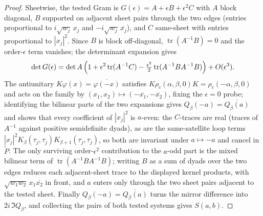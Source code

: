 \documentclass[11pt]{article}
\begin{document}
\begin{proof}
Sheetwise, the tested Gram is $G(\epsilon)=A+\epsilon B+\epsilon^2 C$ with $A$ block diagonal, $B$
supported on adjacent sheet pairs through the two edges (entries proportional to
$i\sqrt{w_j}\,x_j$ and $-i\sqrt{w_j}\,\overline{x_j}$), and $C$ same-sheet with entries proportional
to $|x_j|^2$.
Since $B$ is block off-diagonal, $\operatorname{tr}(A^{-1}B)=0$ and the order-$\epsilon$ term
vanishes; the determinant expansion gives
\[
\det G(\epsilon)
=
\det A\,
\Bigl(
1+\epsilon^2\operatorname{tr}(A^{-1}C)
-\tfrac{\epsilon^2}{2}\operatorname{tr}(A^{-1}BA^{-1}B)
\Bigr)
+O(\epsilon^3).
\]
The antiunitary $K\varphi(x)=\overline{\varphi(-x)}$ satisfies
$K\rho_c(\alpha,\beta,0)K=\rho_c(-\alpha,\beta,0)$ and acts on the family by
$(x_1,x_2)\mapsto(-\overline{x_1},-\overline{x_2})$, fixing the $\epsilon=0$ probe; identifying the
bilinear parts of the two expansions gives $Q_\beta(-a)=\overline{Q_\beta(a)}$ and shows that every
coefficient of $|x_j|^2$ is $a$-even: the $C$-traces are real (traces of $A^{-1}$ against positive
semidefinite dyads), as are the same-satellite loop terms $|x_j|^2K_\beta(\tau_j,\tau_j)
K_{\beta+1}(\tau_j,\tau_j)$, so both are invariant under $a\mapsto-a$ and cancel in $\widetilde P$.
The only surviving order-$\epsilon^2$ contribution to the $a$-odd part is the mixed bilinear term of
$\operatorname{tr}(A^{-1}BA^{-1}B)$; writing $B$ as a sum of dyads over the two edges reduces each
adjacent-sheet trace to the displayed kernel products, with
$\sqrt{w_1w_2}\,x_1\overline{x_2}$ in front, and $a$ enters only through the two sheet pairs
adjacent to the tested sheet.
Finally $Q_\beta(-a)=\overline{Q_\beta(a)}$ turns the mirror difference into
$2i\,\Im Q_\beta$, and collecting the pairs of both tested systems gives $S(a,b)$.
\end{proof}
\end{document}
